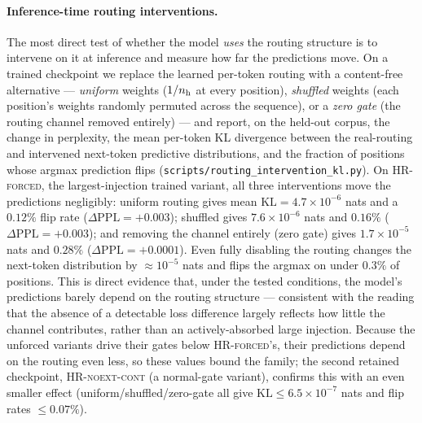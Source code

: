 \paragraph{Inference-time routing interventions.} The most direct test of whether the model \emph{uses} the routing structure is to intervene on it at inference and measure how far the predictions move. On a trained checkpoint we replace the learned per-token routing with a content-free alternative --- \emph{uniform} weights ($1/n_{\text{h}}$ at every position), \emph{shuffled} weights (each position's weights randomly permuted across the sequence), or a \emph{zero gate} (the routing channel removed entirely) --- and report, on the held-out corpus, the change in perplexity, the mean per-token KL divergence between the real-routing and intervened next-token predictive distributions, and the fraction of positions whose argmax prediction flips (\texttt{scripts/routing\_intervention\_kl.py}). On \textsc{HR-forced}, the largest-injection trained variant, all three interventions move the predictions negligibly: uniform routing gives mean $\mathrm{KL} = 4.7\times10^{-6}$ nats and a $0.12\%$ flip rate ($\Delta\mathrm{PPL} = +0.003$); shuffled gives $7.6\times10^{-6}$ nats and $0.16\%$ ($\Delta\mathrm{PPL} = +0.003$); and removing the channel entirely (zero gate) gives $1.7\times10^{-5}$ nats and $0.28\%$ ($\Delta\mathrm{PPL} = +0.0001$). Even fully disabling the routing changes the next-token distribution by $\approx 10^{-5}$ nats and flips the argmax on under $0.3\%$ of positions. This is direct evidence that, under the tested conditions, the model's predictions barely depend on the routing structure --- consistent with the reading that the absence of a detectable loss difference largely reflects how little the channel contributes, rather than an actively-absorbed large injection. Because the unforced variants drive their gates below \textsc{HR-forced}'s, their predictions depend on the routing even less, so these values bound the family; the second retained checkpoint, \textsc{HR-noext-cont} (a normal-gate variant), confirms this with an even smaller effect (uniform/shuffled/zero-gate all give $\mathrm{KL} \le 6.5\times10^{-7}$ nats and flip rates $\le 0.07\%$).


